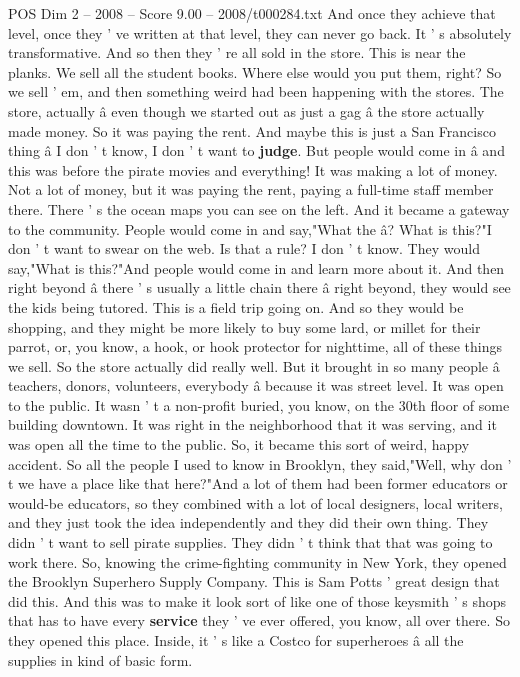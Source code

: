 \begin{textsample}{POS Dim 2 – 2008 – Score 9.00 – 2008/t000284.txt}
And once they achieve that level, once they ' ve written at that level, they can never go back.
It ' s absolutely transformative.
And so then they ' re all sold in the store.
This is near the planks.
We sell all the student books.
Where else would you put them, right?
So we sell ' em, and then something weird had been happening with the stores.
The store, actually â even though we started out as just a gag â the store actually made money.
So it was paying the rent.
And maybe this is just a San Francisco thing â I don ' t know, I don ' t want to \textbf{judge}.
But people would come in â and this was before the pirate movies and everything!
It was making a lot of money.
Not a lot of money, but it was paying the rent, paying a full-time staff member there.
There ' s the ocean maps you can see on the left.
And it became a gateway to the community.
People would come in and say,"What the â?
What is this?"I don ' t want to swear on the web.
Is that a rule?
I don ' t know.
They would say,"What is this?"And people would come in and learn more about it.
And then right beyond â there ' s usually a little chain there â right beyond, they would see the kids being tutored.
This is a field trip going on.
And so they would be shopping, and they might be more likely to buy some lard, or millet for their parrot, or, you know, a hook, or hook protector for nighttime, all of these things we sell.
So the store actually did really well.
But it brought in so many people â teachers, donors, volunteers, everybody â because it was street level.
It was open to the public.
It wasn ' t a non-profit buried, you know, on the 30th floor of some building downtown.
It was right in the neighborhood that it was serving, and it was open all the time to the public.
So, it became this sort of weird, happy accident.
So all the people I used to know in Brooklyn, they said,"Well, why don ' t we have a place like that here?"And a lot of them had been former educators or would-be educators, so they combined with a lot of local designers, local writers, and they just took the idea independently and they did their own thing.
They didn ' t want to sell pirate supplies.
They didn ' t think that that was going to work there.
So, knowing the crime-fighting community in New York, they opened the Brooklyn Superhero Supply Company.
This is Sam Potts ' great design that did this.
And this was to make it look sort of like one of those keysmith ' s shops that has to have every \textbf{service} they ' ve ever offered, you know, all over there.
So they opened this place.
Inside, it ' s like a Costco for superheroes â all the supplies in kind of basic form.

\end{textsample}
